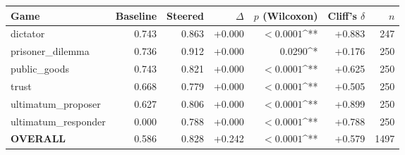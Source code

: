 \begin{tabular}{lrrrrrr}
\toprule
Game & Baseline & Steered & $\Delta$ & $p$ (Wilcoxon) & Cliff's $\delta$ & $n$ \\
\midrule
dictator & 0.743 & 0.863 & +0.000 & $<0.0001$^{**} & +0.883 & 247 \\
prisoner_dilemma & 0.736 & 0.912 & +0.000 & 0.0290^{*} & +0.176 & 250 \\
public_goods & 0.743 & 0.821 & +0.000 & $<0.0001$^{**} & +0.625 & 250 \\
trust & 0.668 & 0.779 & +0.000 & $<0.0001$^{**} & +0.505 & 250 \\
ultimatum_proposer & 0.627 & 0.806 & +0.000 & $<0.0001$^{**} & +0.899 & 250 \\
ultimatum_responder & 0.000 & 0.788 & +0.000 & $<0.0001$^{**} & +0.788 & 250 \\
\textbf{OVERALL} & 0.586 & 0.828 & +0.242 & $<0.0001$^{**} & +0.579 & 1497 \\
\bottomrule
\end{tabular}
